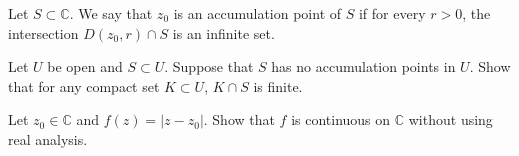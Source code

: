 \documentclass{article}
\newcounter{Problem}
\newenvironment{Problem}{\begin{Exercise}[name={Problem},
                                          counter={Problem}]}
                        {\end{Exercise}}
\begin{document}
\begin{Problem}
  Let $S \subset \mathbb{C}$. We say that $z_0$ is an accumulation
  point of $S$ if for every $r > 0$, the intersection
  $D(z_0, r) \cap S$ is an infinite set.

  Let $U$ be open and $S \subset U$. Suppose that $S$ has no accumulation
  points in $U$. Show that for any compact set $K \subset U$,
  $K \cap S$ is finite.
\end{Problem}

\begin{Problem}
  Let $z_0 \in \mathbb{C}$ and $f(z) = |z - z_0|$. Show that
  $f$ is continuous on $\mathbb{C}$ without using real analysis.
\end{Problem}
\end{document}
